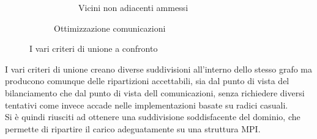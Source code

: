 {\begin{figure}[H]
\begin{subfigure}{1.0\textwidth}
\begin{subfigure}{0.5\textwidth}
		Vicini non adiacenti ammessi
	\end{subfigure}
	\caption{Ottimizzazione comunicazioni\newline}
	\label{fig:comm_comm}
\end{subfigure}
	\caption{I vari criteri di unione a confronto}
\end{figure}

I vari criteri di unione creano diverse suddivisioni all'interno dello stesso grafo ma producono comunque delle ripartizioni accettabili, sia dal punto di vista del bilanciamento che dal punto di vista dell comunicazioni, senza richiedere diversi tentativi come invece accade nelle implementazioni basate su radici casuali.\\
Si è quindi riusciti ad ottenere una suddivisione soddisfacente del dominio, che permette di ripartire il carico adeguatamente su una struttura MPI.


}
